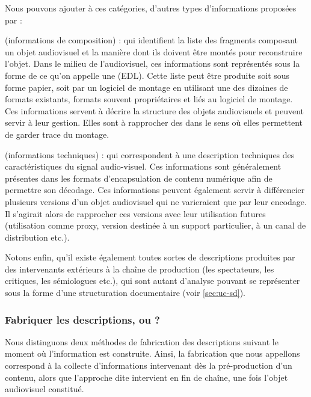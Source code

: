 Nous pouvons ajouter à ces catégories, d'autres types d'informations proposées par \cite{Rayers2002} : 
\begin{liste} 
	\item {} (informations de composition) : qui identifient la liste des fragments composant un objet audiovisuel et la manière dont ils doivent être montés pour reconstruire l'objet. 
	Dans le milieu de l'audiovisuel, ces informations sont représentés sous la forme de ce qu'on appelle une  (EDL).
	Cette liste peut être produite soit sous forme papier, soit par un logiciel de montage en utilisant une des dizaines de formats existants, formats souvent propriétaires et liés au logiciel de montage. 
	Ces informations servent à décrire la structure des objets audiovisuels et peuvent servir à leur gestion.
	Elles sont à rapprocher des  dans le sens où elles permettent de garder trace du montage. 


	\item {} (informations techniques) : qui correspondent à une description techniques des caractéristiques du signal audio-visuel. 
	Ces informations sont généralement présentes dans les formats d'encapsulation de contenu numérique afin de permettre son décodage.
	Ces informations peuvent également servir à différencier plusieurs versions d'un objet audiovisuel qui ne varieraient que par leur encodage. 
	Il s'agirait alors de rapprocher ces versions avec leur utilisation futures (utilisation comme proxy, version destinée à un support particulier, à un canal de distribution etc.).
\end{liste}


Notons enfin, qu'il existe également toutes sortes de descriptions produites par des intervenants extérieurs à la chaîne de production (les spectateurs, les critiques, les sémiologues etc.), qui sont autant d'analyse pouvant se représenter sous la forme d'une structuration documentaire (voir \ref{sec:uc-sd}).



\subsubsection{Fabriquer les descriptions,  ou  ?}\label{sec:codesc}
Nous distinguons deux méthodes de fabrication des descriptions suivant le moment où l'information est construite.
Ainsi, la fabrication que nous appellons  correspond à la collecte d'informations intervenant dès la pré-production d'un contenu, alors que l'approche dite  intervient en fin de chaîne, une fois l'objet audiovisuel constitué.

